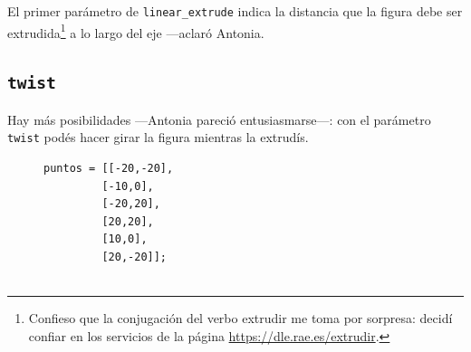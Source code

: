  
  \guillemotright El primer parámetro de \lstinline!linear_extrude!
  indica la distancia que la figura debe ser
  extrudida\footnote{Confieso que la conjugación del verbo extrudir me
    toma por sorpresa: decidí confiar en los servicios de la página
    \url{https://dle.rae.es/extrudir}.} a lo largo del eje 
  ---aclaró Antonia.

\subsection{\texttt{twist}}

\guillemotright Hay más posibilidades ---Antonia pareció
en\-tu\-sias\-mar\-se---: con el parámetro \lstinline!twist! podés
hacer girar la figura mientras la extrudís.


  \begin{figure}[ht]
  \begin{minipage}[]{.6\textwidth}%
    \begin{lstlisting}
puntos = [[-20,-20],
         [-10,0],
         [-20,20],
         [20,20],
         [10,0],
         [20,-20]];


\end{lstlisting}
\end{minipage}
\end{figure}
